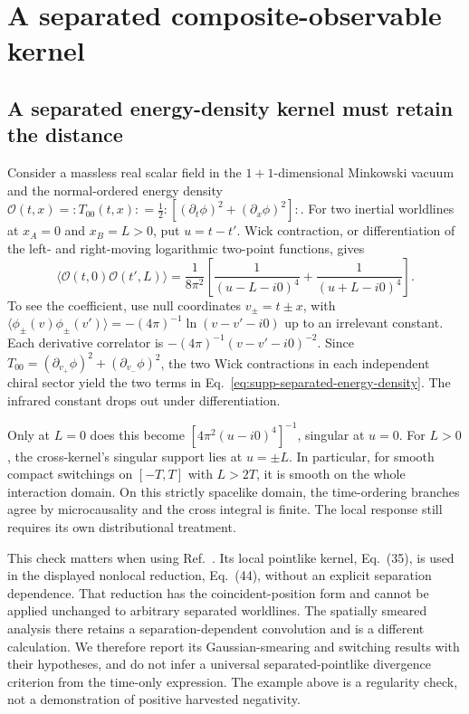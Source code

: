 \documentclass[pdflatex,sn-mathphys-num]{sn-jnl}
\begin{document}
\section{A separated composite-observable kernel}
\label{app:composite-kernel}
\subsection{A separated energy-density kernel must retain the distance}
Consider a massless real scalar field in the $1+1$-dimensional Minkowski vacuum and the normal-ordered energy density
$\mathcal O(t,x)=:\!T_{00}(t,x)\!:
=\tfrac12:\![(\partial_t\phi)^2+(\partial_x\phi)^2]\!:$.
For two inertial worldlines at $x_A=0$ and $x_B=L>0$, put $u=t-t'$. Wick contraction, or differentiation of the left- and right-moving logarithmic two-point functions, gives
\begin{equation}
\langle\mathcal O(t,0)\mathcal O(t',L)\rangle
=\frac{1}{8\pi^2}\left[
\frac{1}{(u-L-i0)^4}+\frac{1}{(u+L-i0)^4}\right].
\label{eq:supp-separated-energy-density}
\end{equation}
To see the coefficient, use null coordinates $v_\pm=t\pm x$, with
$\langle\phi_\pm(v)\phi_\pm(v')\rangle=-(4\pi)^{-1}\ln(v-v'-i0)$ up to an irrelevant constant. Each derivative correlator is $-(4\pi)^{-1}(v-v'-i0)^{-2}$. Since
$T_{00}=(\partial_{v_+}\phi)^2+(\partial_{v_-}\phi)^2$, the two Wick contractions in each independent chiral sector yield the two terms in Eq.~\eqref{eq:supp-separated-energy-density}. The infrared constant drops out under differentiation.

Only at $L=0$ does this become $[4\pi^2(u-i0)^4]^{-1}$, singular at $u=0$. For $L>0$, the cross-kernel's singular support lies at $u=\pm L$. In particular, for smooth compact switchings on $[-T,T]$ with $L>2T$, it is smooth on the whole interaction domain. On this strictly spacelike domain, the time-ordering branches agree by microcausality and the cross integral is finite. The local response still requires its own distributional treatment.

This check matters when using Ref.~\cite{ZambiancoRagulaMartinez2026UV}. Its local pointlike kernel, Eq.~(35), is used in the displayed nonlocal reduction, Eq.~(44), without an explicit separation dependence. That reduction has the coincident-position form and cannot be applied unchanged to arbitrary separated worldlines. The spatially smeared analysis there retains a separation-dependent convolution and is a different calculation. We therefore report its Gaussian-smearing and switching results with their hypotheses, and do not infer a universal separated-pointlike divergence criterion from the time-only expression. The example above is a regularity check, not a demonstration of positive harvested negativity.
\end{document}
